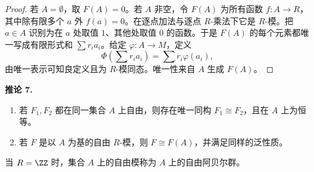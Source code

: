 \begin{proof}
	若 $A=\emptyset$，取 $F(A)=0$。若 $A$ 非空，令 $F(A)$ 为所有函数 $f:A\to R$，其中除有限多个 $a$ 外 $f(a)=0$。在逐点加法与逐点 $R$-乘法下它是 $R$-模。把 $a\in A$ 识别为在 $a$ 处取值 $1$、其他处取值 $0$ 的函数。于是 $F(A)$ 的每个元素都唯一写成有限形式和 $\sum r_i a_i$。给定 $\varphi:A\to M$，定义
	\[
	\Phi\left(\sum r_i a_i\right)=\sum r_i\varphi(a_i),
	\]
	由唯一表示可知良定义且为 $R$-模同态。唯一性来自 $A$ 生成 $F(A)$。
\end{proof}


\noindent\textbf{推论 7.}
\begin{enumerate}[label=(\arabic*)]
	\item 若 $F_1,F_2$ 都在同一集合 $A$ 上自由，则存在唯一同构 $F_1\cong F_2$，且在 $A$ 上为恒等。
	\item 若 $F$ 是以 $A$ 为基的自由 $R$-模，则 $F\cong F(A)$，并满足同样的泛性质。
\end{enumerate}
当 $R=\ZZ$ 时，集合 $A$ 上的自由模称为 $A$ 上的自由阿贝尔群。


